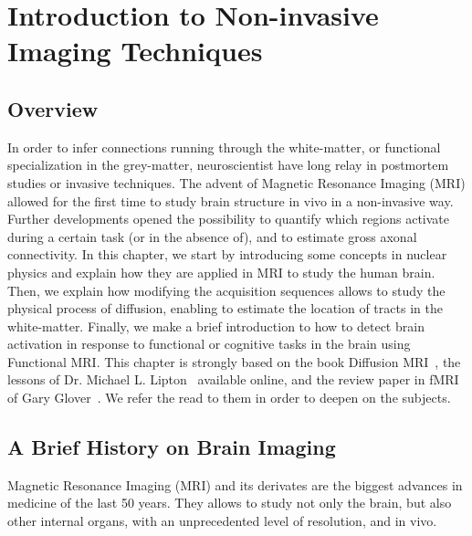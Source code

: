 \chapter{Introduction to Non-invasive Imaging Techniques}
\label{ch:intro_mri}

\section{Overview}
In order to infer connections running through the white-matter, or functional
specialization in the grey-matter, neuroscientist have long relay in postmortem
studies or invasive techniques. The advent of Magnetic Resonance Imaging (MRI)
allowed for the first time to study brain structure in vivo in a non-invasive
way. Further developments opened the possibility to quantify which regions
activate during a certain task (or in the absence of), and to estimate gross
axonal connectivity. In this chapter, we start by introducing some concepts in
nuclear physics and explain how they are applied in MRI to study the human
brain. Then, we explain how modifying the acquisition sequences allows to
study the physical process of diffusion, enabling to estimate the location
of tracts in the white-matter. Finally, we make a brief introduction to how to
detect brain activation in response to functional or cognitive tasks in the
brain using Functional MRI. This chapter is strongly based on the book
Diffusion MRI~\cite{Basser2009}, the lessons of Dr. Michael L. 
Lipton~\cite{Lipton2014} available online, and the review paper in fMRI of 
Gary Glover~\cite{Glover2011}. We refer the read to them in order to deepen on
the subjects.

\section{A Brief History on Brain Imaging}

Magnetic Resonance Imaging (MRI) and its derivates are the biggest advances in
medicine of the last 50 years. They allows to study not only the brain, but also
other internal organs, with an unprecedented level of resolution, and in vivo. 

